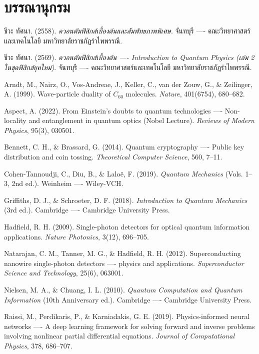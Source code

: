\chapter*{บรรณานุกรม}

\begin{enumerate}[label={[\arabic*]}, leftmargin=1.2cm]
    \item ชีวะ ทัศนา. (2558). \textit{ควอนตัมฟิสิกส์เบื้องต้นและสัมพัทธภาพพิเศษ}. จันทบุรี ---- คณะวิทยาศาสตร์และเทคโนโลยี มหาวิทยาลัยราชภัฏรำไพพรรณี.
    \item ชีวะ ทัศนา. (2569). \textit{ควอนตัมฟิสิกส์เบื้องต้น ---- Introduction to Quantum Physics (เล่ม 2 ในชุดฟิสิกส์ยุคใหม่)}. จันทบุรี ---- คณะวิทยาศาสตร์และเทคโนโลยี มหาวิทยาลัยราชภัฏรำไพพรรณี.
    \item Arndt, M., Nairz, O., Vos-Andreae, J., Keller, C., van der Zouw, G., \& Zeilinger, A. (1999). Wave-particle duality of $C_{60}$ molecules. \textit{Nature}, 401(6754), 680--682.
    \item Aspect, A. (2022). From Einstein's doubts to quantum technologies ---- Non-locality and entanglement in quantum optics (Nobel Lecture). \textit{Reviews of Modern Physics}, 95(3), 030501.
    \item Bennett, C. H., \& Brassard, G. (2014). Quantum cryptography ---- Public key distribution and coin tossing. \textit{Theoretical Computer Science}, 560, 7--11.
    \item Cohen-Tannoudji, C., Diu, B., \& Lalo{\"e}, F. (2019). \textit{Quantum Mechanics} (Vols. 1--3, 2nd ed.). Weinheim ---- Wiley-VCH.
    \item Griffiths, D. J., \& Schroeter, D. F. (2018). \textit{Introduction to Quantum Mechanics} (3rd ed.). Cambridge ---- Cambridge University Press.
    \item Hadfield, R. H. (2009). Single-photon detectors for optical quantum information applications. \textit{Nature Photonics}, 3(12), 696--705.
    \item Natarajan, C. M., Tanner, M. G., \& Hadfield, R. H. (2012). Superconducting nanowire single-photon detectors ---- physics and applications. \textit{Superconductor Science and Technology}, 25(6), 063001.
    \item Nielsen, M. A., \& Chuang, I. L. (2010). \textit{Quantum Computation and Quantum Information} (10th Anniversary ed.). Cambridge ---- Cambridge University Press.
    \item Raissi, M., Perdikaris, P., \& Karniadakis, G. E. (2019). Physics-informed neural networks ---- A deep learning framework for solving forward and inverse problems involving nonlinear partial differential equations. \textit{Journal of Computational Physics}, 378, 686--707.

\end{enumerate}
